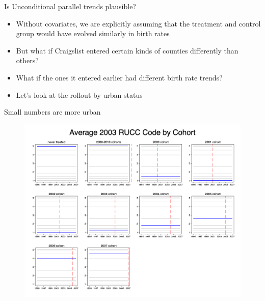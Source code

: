 \documentclass{beamer}
\begin{document}
\begin{frame}{Is Unconditional parallel trends plausible?}

\begin{itemize}
\item Without covariates, we are explicitly assuming that the treatment and control group would have evolved similarly in birth rates
\item But what if Craigslist entered certain kinds of counties differently than others?
\item What if the ones it entered earlier had different birth rate trends?
\item Let's look at the rollout by urban status
\end{itemize}

\end{frame}

\begin{frame}{Small numbers are more urban}

\begin{figure}
    \centering
    \includegraphics[height=0.85\textheight]{./lecture_includes/pretty_RUCC}
\end{figure}

\end{frame}
\end{document}

